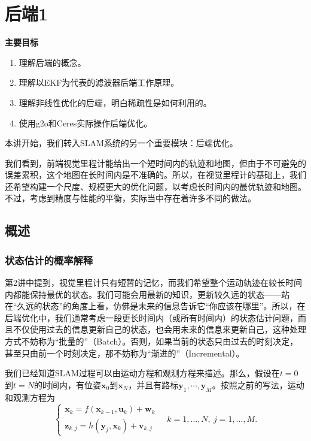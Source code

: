 \chapter{后端1}
\begin{mdframed}  
	\textbf{主要目标}
	\begin{enumerate}[labelindent=0em,leftmargin=1.5em]
		\item 理解后端的概念。
		\item 理解以EKF为代表的滤波器后端工作原理。
		\item 理解非线性优化的后端，明白稀疏性是如何利用的。
		\item 使用g2o和Ceres实际操作后端优化。
	\end{enumerate}
\end{mdframed}

本讲开始，我们转入SLAM系统的另一个重要模块：后端优化。

我们看到，前端视觉里程计能给出一个短时间内的轨迹和地图，但由于不可避免的误差累积，这个地图在长时间内是不准确的。所以，在视觉里程计的基础上，我们还希望构建一个尺度、规模更大的优化问题，以考虑长时间内的最优轨迹和地图。不过，考虑到精度与性能的平衡，实际当中存在着许多不同的做法。

\newpage


\newpage
\section{概述}
\subsection{状态估计的概率解释}
第2讲中提到，视觉里程计只有短暂的记忆，而我们希望整个运动轨迹在较长时间内都能保持最优的状态。我们可能会用最新的知识，更新较久远的状态——站在“久远的状态”的角度上看，仿佛是未来的信息告诉它“你应该在哪里”。所以，在后端优化中，我们通常考虑一段更长时间内（或所有时间内）的状态估计问题，而且不仅使用过去的信息更新自己的状态，也会用未来的信息来更新自己，这种处理方式不妨称为“批量的”（Batch）。否则，如果当前的状态只由过去的时刻决定，甚至只由前一个时刻决定，那不妨称为“渐进的”（Incremental）。

我们已经知道SLAM过程可以由运动方程和观测方程来描述。那么，假设在$t=0$到$t=N$的时间内，有位姿$\bm{x}_0$到$\bm{x}_N$，并且有路标$\bm{y}_1, \cdots, \bm{y}_M$。按照之前的写法，运动和观测方程为
\begin{equation}
\left\{ \begin{array}{l}
{\bm{x}_k} = f\left( {{\bm{x}_{k - 1}},{\bm{u}_k}} \right) + \bm{w}_k \\
{\bm{z}_{k,j}} = h\left( {{ \bm{y}_j},{ \bm{x}_k}}  \right)+ \bm{v}_{k,j}
   \end{array} \right. \quad k=1, \ldots, N, \  j=1, \ldots, M.
\end{equation}


